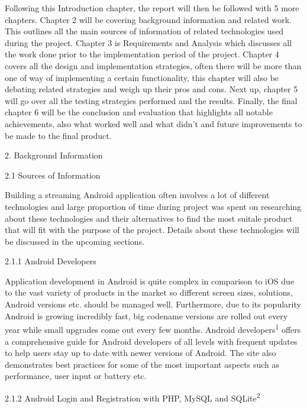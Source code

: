 \documentclass{article}
\begin{document}
\begin{flushleft}
Following this Introduction chapter, the report will then be followed with 5 more chapters. Chapter 2 will be covering background information and related work. This outlines all the main sources of information of related technologies used during the project. Chapter 3 is Requirements and Analysis which discusses all the work done prior to the implementation period of the project. Chapter 4 covers  all the design and implementation strategies, often there will be more than one of way of implementing a certain functionality, this chapter will also be debating related strategies and weigh up their pros and cons. Next up, chapter 5 will go over all the testing strategies performed and the results. Finally, the final chapter 6 will be the conclusion and evaluation that highlights all notable achievements, also what worked well and what didn't and future improvements to be made to the final product.\par
{\huge 2. Background Information}\par
{\Large 2.1 Sources of Information}\par
Building a streaming Android application often involves a lot of different technologies and large proportion of time during project was spent on researching about these technologies and their alternatives to find the most suitale product that will fit with the purpose of the project. Details about these technologies will be discussed in the upcoming sections.\par
{\large 2.1.1 Android Developers}\par
Application development in Android is quite complex in comparison to iOS due to the vast variety of products in the market so different screen sizes, solutions, Android versions etc. should be managed well. Furthermore, due to its popularity Android is growing incredibly fast, big codename versions are rolled out every year while small upgrades come out every few months. Android developers\textsuperscript{1} offers a comprehensive guide for Android developers of all levels with frequent updates to help users stay up to date with newer versions of Android. The site also demonstrates best practices for some of the most important aspects such as performance, user input or battery etc.\par
{\large 2.1.2 Android Login and Registration with PHP, MySQL and SQLite\textsuperscript{2}}\par

\end{flushleft}
\end{document}
